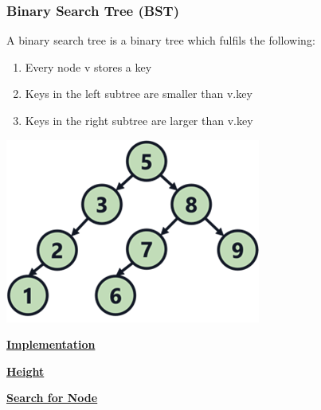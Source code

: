     \subsubsection{Binary Search Tree (BST)}
        \begin{minipage}{0.49\linewidth}
            A binary search tree is a binary tree which fulfils the following:
            \begin{enumerate}
                \item Every node v stores a key
                \item Keys in the left subtree are smaller than v.key
                \item Keys in the right subtree are larger than v.key
            \end{enumerate}
        \end{minipage}
        \begin{minipage}{0.49\linewidth}
            \includegraphics[width = \linewidth]{src/4_data_structure/images/bst.png}
        \end{minipage}

        {\centering\underline{\textbf{Implementation}} \par}
            

        {\centering\underline{\textbf{Height}} \par}
            

        {\centering\underline{\textbf{Search for Node}} \par}
            

